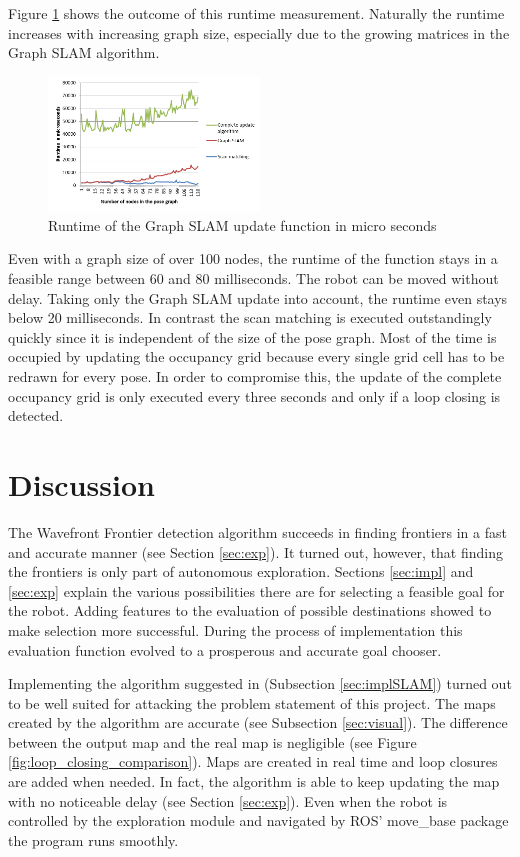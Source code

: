 \documentclass{ba-kecs}
\begin{document}
Figure \ref{fig:runtime} shows the outcome of this runtime measurement. Naturally the runtime increases with increasing graph size, especially due to the growing matrices in the Graph SLAM algorithm.

\begin{figure}[htbp]
	\centering
		\includegraphics[width=0.50\textwidth]{figures/Runtime.png}
	\caption{Runtime of the Graph SLAM update function in micro seconds}
	\label{fig:runtime}
\end{figure}

Even with a graph size of over 100 nodes, the runtime of the function stays in a feasible range between 60 and 80 milliseconds. The robot can be moved without delay. Taking only the Graph SLAM update into account, the runtime even stays below 20 milliseconds. In contrast the scan matching is executed outstandingly quickly since it is independent of the size of the pose graph. Most of the time is occupied by updating the occupancy grid because every single grid cell has to be redrawn for every pose. In order to compromise this, the update of the complete occupancy grid is only executed every three seconds and only if a loop closing is detected.

\section{Discussion}
\label{sec:disc}
The Wavefront Frontier detection algorithm \citep{Keidar} succeeds in finding frontiers in a fast and accurate manner (see Section \ref{sec:exp}). It turned out, however, that finding the frontiers is only part of autonomous exploration. Sections \ref{sec:impl} and \ref{sec:exp} explain the various possibilities there are for selecting a feasible goal for the robot. Adding features to the evaluation of possible destinations showed to make selection more successful. During the process of implementation this evaluation function evolved to a prosperous and accurate goal chooser.

Implementing the algorithm suggested in \citep{Grisetti} (Subsection \ref{sec:implSLAM}) turned out to be well suited for attacking the problem statement of this project. The maps created by the algorithm are accurate (see Subsection \ref{sec:visual}). The difference between the output map and the real map is negligible (see Figure \ref{fig:loop_closing_comparison}). Maps are created in real time and loop closures are added when needed. In fact, the algorithm is able to keep updating the map with no noticeable delay (see Section \ref{sec:exp}). Even when the robot is controlled by the exploration module and navigated by ROS' move\_base package the program runs smoothly.
\end{document}
